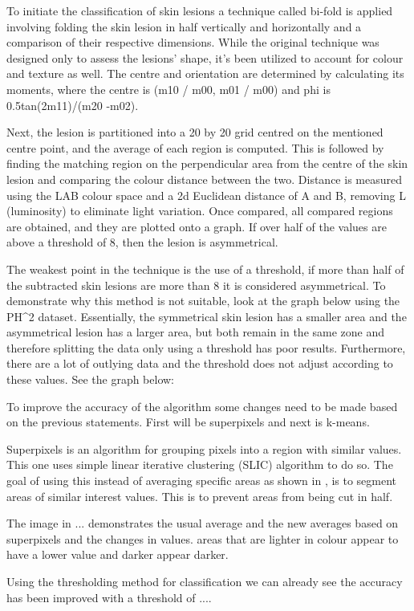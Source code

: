 To initiate the classification of skin lesions a technique called bi-fold is applied involving folding the skin lesion in half vertically and horizontally and a comparison of their respective dimensions. While the original technique was designed only to assess the lesions' shape, it's been utilized to account for colour and texture as well. The centre and orientation are determined by calculating its moments, where the centre is (m10 / m00, m01 / m00) and phi is 0.5tan(2m11)/(m20 -m02). 

Next, the lesion is partitioned into a 20 by 20 grid centred on the mentioned centre point, and the average of each region is computed. This is followed by finding the matching region on the perpendicular area from the centre of the skin lesion and comparing the colour distance between the two. Distance is measured using the LAB colour space and a 2d Euclidean distance of A and B, removing L (luminosity) to eliminate light variation. Once compared, all compared regions are obtained, and they are plotted onto a graph. If over half of the values are above a threshold of 8, then the lesion is asymmetrical.

The weakest point in the technique is the use of a threshold, if more than half of the subtracted skin lesions are more than 8 it is considered asymmetrical. To demonstrate why this method is not suitable, look at the graph below using the PH^2 dataset. Essentially, the symmetrical skin lesion has a smaller area and the asymmetrical lesion has a larger area, but both remain in the same zone and therefore splitting the data only using a threshold has poor results. Furthermore, there are a lot of outlying data and the threshold does not adjust according to these values. See the graph below:


To improve the accuracy of the algorithm some changes need to be made based on the previous statements. First will be superpixels and next is k-means.

Superpixels is an algorithm for grouping pixels into a region with similar values. This one uses simple linear iterative clustering (SLIC) algorithm \cite{} to do so. The goal of using this instead of averaging specific areas as shown in \cite{}, is to segment areas of similar interest values. This is to prevent areas from being cut in half.

The image in ... demonstrates the usual average and the new averages based on superpixels and the changes in values. areas that are lighter in colour appear to have a lower value and darker appear darker.

Using the thresholding method for classification we can already see the accuracy has been improved with a threshold of ....